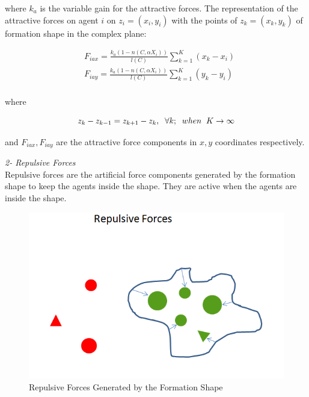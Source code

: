 where $k_a$ is the variable gain for the attractive forces. The representation of the attractive forces on agent $i$ on $z_i = (x_i, y_i)$ with the points of  $z_k = (x_k,y_k)$ of formation shape in the complex plane:

\begin{align*}
& F_{iax} =\frac{k_a (1-n(C,\alpha X_i))}{l(C)}  \sum_{k=1}^{K} (x_k  - x_i)\\
& F_{iay} =\frac{k_a (1-n(C,\alpha X_i))}{l(C)}  \sum_{k=1}^{K} (y_k  - y_i)\\
\end{align*}
			
where

\begin{equation}
z_k - z_{k-1} = z_{k+1} - z_k, \hspace{0.2cm}  \forall k ;  \hspace{0.2cm} when  \hspace{0.2cm} K \to\infty
\end{equation}
			
and $F_{iax} , F_{iay} $ are the attractive force components in $x,y$ coordinates respectively.\newline
			
\textit{	2- Repulsive Forces} \\ 
Repulsive forces are the artificial force components generated by the formation shape to keep the agents inside the shape. They are active when the agents are inside the shape. 
					
\begin{figure}[H]
\caption{Repulsive Forces Generated by the Formation Shape}
\centering
\includegraphics[scale = 0.60]{repulsive_forces}
\end{figure}
							
